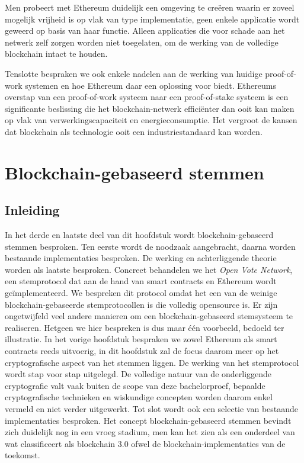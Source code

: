 		 Men probeert met Ethereum duidelijk een omgeving te creëren waarin er zoveel mogelijk vrijheid is op vlak van type implementatie, geen enkele applicatie wordt geweerd op basis van haar functie. Alleen applicaties die voor schade aan het netwerk zelf zorgen worden niet toegelaten, om de werking van de volledige blockchain intact te houden. ~\autocite{Buterin2014}
		 
		 Tenslotte bespraken we ook enkele nadelen aan de werking van huidige proof-of-work systemen en hoe Ethereum daar een oplossing voor biedt. Ethereums overstap van een proof-of-work systeem naar een proof-of-stake systeem is een significante beslissing die het blockchain-netwerk efficiënter dan ooit kan maken op vlak van verwerkingscapaciteit en energieconsumptie. Het vergroot de kansen dat blockchain als technologie ooit een industriestandaard kan worden. ~\autocite{Buterin2014}
		\newpage
\section{Blockchain-gebaseerd stemmen}
\label{sec:blockchain-gebaseerd-stemmen}
	\subsection*{Inleiding}
			In het derde en laatste deel van dit hoofdstuk wordt blockchain-gebaseerd stemmen besproken. Ten eerste wordt de noodzaak aangebracht, daarna worden bestaande implementaties besproken. De werking en achterliggende theorie worden als laatste besproken. Concreet behandelen we het \textit{Open Vote Network}, een stemprotocol dat  aan de hand van smart contracts en Ethereum wordt geïmplementeerd. We bespreken dit protocol omdat het een van de weinige blockchain-gebaseerde stemprotocollen is die volledig opensource is. Er zijn ongetwijfeld veel andere manieren om een blockchain-gebaseerd stemsysteem te realiseren. Hetgeen we hier bespreken is dus maar één voorbeeld, bedoeld ter illustratie.  In het vorige hoofdstuk bespraken we zowel Ethereum als smart contracts reeds uitvoerig, in dit hoofdstuk zal de focus daarom meer op het cryptografische aspect van het stemmen liggen. De werking van het stemprotocol wordt stap voor stap uitgelegd. De volledige natuur van de onderliggende cryptografie valt vaak buiten de scope van deze bachelorproef, bepaalde cryptografische technieken en wiskundige concepten worden daarom enkel vermeld en niet verder uitgewerkt. Tot slot wordt ook een selectie van bestaande implementaties besproken.
			Het concept blockchain-gebaseerd stemmen bevindt zich duidelijk nog in een vroeg stadium, men kan het zien als een onderdeel van wat \textcite{Swan2015} classificeert als blockchain 3.0 ofwel de blockchain-implementaties van de toekomst.
